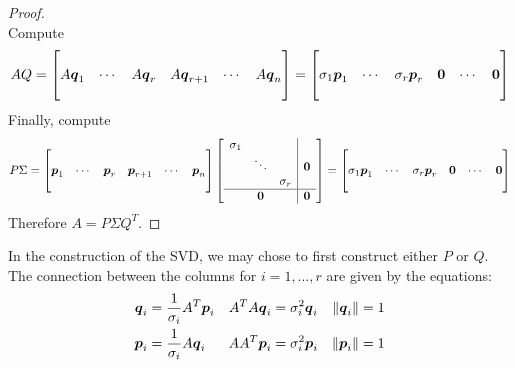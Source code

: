 \begin{theorem}
\begin{proof}
$$$$
Compute
$$
AQ = \begin{bmatrix} & & & & & \\ A \boldsymbol{q}_1 & \cdots & A\boldsymbol{q}_r & A\boldsymbol{q}_{r+1} & \cdots & A\boldsymbol{q}_n \\ & & & & & \end{bmatrix} = \begin{bmatrix} & & & & & \\ \sigma_1 \boldsymbol{p}_1 & \cdots & \sigma_r \boldsymbol{p}_r & \boldsymbol{0} & \cdots & \boldsymbol{0} \\ & & & & & \end{bmatrix}
$$
Finally, compute
$$
P \Sigma = \begin{bmatrix} & & & & & \\ \boldsymbol{p}_1 & \cdots & \boldsymbol{p}_r & \boldsymbol{p}_{r+1} & \cdots & \boldsymbol{p}_n \\ & & & & & \end{bmatrix} \left[
\begin{array}{ccc|c}
\sigma_1 & & & \\
& \ddots & & \boldsymbol{0} \\
& & \sigma_r & \\ \hline
& \boldsymbol{0} & & \boldsymbol{0}
\end{array} \right]
=
\begin{bmatrix} & & & & & \\ \sigma_1 \boldsymbol{p}_1 & \cdots & \sigma_r \boldsymbol{p}_r & \boldsymbol{0} & \cdots & \boldsymbol{0} \\ & & & & & \end{bmatrix}
$$
Therefore $A = P \Sigma Q^T$.
\end{proof}
\end{theorem}

\begin{note}
In the construction of the SVD, we may chose to first construct  either $P$ or $Q$. The connection between the columns for $i = 1,\dots,r$ are given by the equations:
\begin{align*}
\boldsymbol{q}_i &= \frac{1}{\sigma_i} A^T \boldsymbol{p}_i & A^TA \boldsymbol{q}_i &= \sigma_i^2 \boldsymbol{q}_i & \| \boldsymbol{q}_i \| &= 1 \\
\boldsymbol{p}_i &= \frac{1}{\sigma_i} A \boldsymbol{q}_i & AA^T \boldsymbol{p}_i &= \sigma_i^2 \boldsymbol{p}_i & \| \boldsymbol{p}_i \| &= 1
\end{align*}
\end{note}

